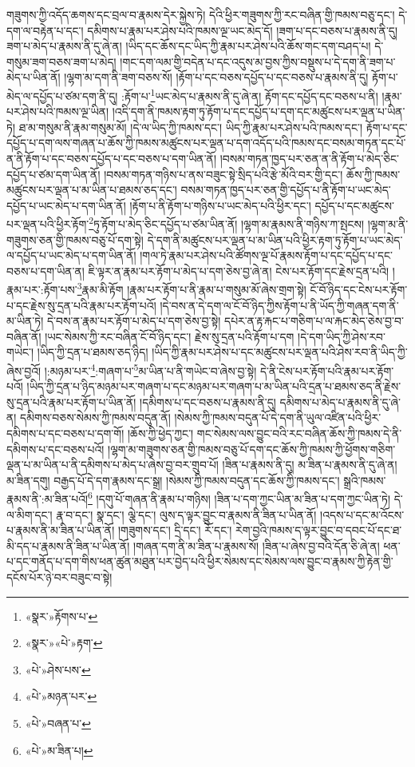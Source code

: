 གཟུགས་ཀྱི་འདོད་ཆགས་དང་བྲལ་བ་རྣམས་དེར་སྐྱེས་ཏེ། དེའི་ཕྱིར་གཟུགས་ཀྱི་རང་བཞིན་གྱི་ཁམས་བཅུ་དང་། དེ་དག་ལ་བརྟེན་པ་དང་། དམིགས་པ་རྣམ་པར་ཤེས་པའི་ཁམས་ལྔ་ཡང་མེད་དོ། །ཟག་པ་དང་བཅས་པ་རྣམས་ནི་དུ། ཟག་པ་མེད་པ་རྣམས་ནི་དུ་ཞེ་ན། །ཡིད་དང་ཆོས་དང་ཡིད་ཀྱི་རྣམ་པར་ཤེས་པའི་ཆོས་གང་དག་བཤད་པ། དེ་གསུམ་ཟག་བཅས་ཟག་པ་མེད། །གང་དག་ལམ་གྱི་བདེན་པ་དང་འདུས་མ་བྱས་ཀྱིས་བསྡུས་པ་དེ་དག་ནི་ཟག་པ་མེད་པ་ཡིན་ནོ། །ལྷག་མ་དག་ནི་ཟག་བཅས་སོ། །རྟོག་པ་དང་བཅས་དཔྱོད་པ་དང་བཅས་པ་རྣམས་ནི་དུ། རྟོག་པ་མེད་ལ་དཔྱོད་པ་ཙམ་དག་ནི་དུ། :རྟོག་པ་\footnote{«སྣར་»རྟོགས་པ་}ཡང་མེད་པ་རྣམས་ནི་དུ་ཞེ་ན། རྟོག་དང་དཔྱོད་དང་བཅས་པ་ནི། །རྣམ་པར་ཤེས་པའི་ཁམས་ལྔ་ཡིན། །འདི་དག་ནི་ཁམས་རྟག་ཏུ་རྟོག་པ་དང་དཔྱོད་པ་དག་དང་མཚུངས་པར་ལྡན་པ་ཡིན་ཏེ། ཐ་མ་གསུམ་ནི་རྣམ་གསུམ་མོ། །དེ་ལ་ཡིད་ཀྱི་ཁམས་དང་། ཡིད་ཀྱི་རྣམ་པར་ཤེས་པའི་ཁམས་དང་། རྟོག་པ་དང་དཔྱོད་པ་དག་ལས་གཞན་པ་ཆོས་ཀྱི་ཁམས་མཚུངས་པར་ལྡན་པ་དག་འདོད་པའི་ཁམས་དང་བསམ་གཏན་དང་པོ་ན་ནི་རྟོག་པ་དང་བཅས་དཔྱོད་པ་དང་བཅས་པ་དག་ཡིན་ནོ། །བསམ་གཏན་ཁྱད་པར་ཅན་ན་ནི་རྟོག་པ་མེད་ཅིང་དཔྱོད་པ་ཙམ་དག་ཡིན་ནོ། །བསམ་གཏན་གཉིས་པ་ནས་བཟུང་སྟེ་སྲིད་པའི་རྩེ་མོའི་བར་གྱི་དང་། ཆོས་ཀྱི་ཁམས་མཚུངས་པར་ལྡན་པ་མ་ཡིན་པ་ཐམས་ཅད་དང་། བསམ་གཏན་ཁྱད་པར་ཅན་གྱི་དཔྱོད་པ་ནི་རྟོག་པ་ཡང་མེད་དཔྱོད་པ་ཡང་མེད་པ་དག་ཡིན་ནོ། །རྟོག་པ་ནི་རྟོག་པ་གཉིས་པ་ཡང་མེད་པའི་ཕྱིར་དང་། དཔྱོད་པ་དང་མཚུངས་པར་ལྡན་པའི་ཕྱིར་རྟོག་\footnote{«སྣར་»«པེ་»རྟག་}ཏུ་རྟོག་པ་མེད་ཅིང་དཔྱོད་པ་ཙམ་ཡིན་ནོ། །ལྷག་མ་རྣམས་ནི་གཉིས་ཀ་སྤངས། །ལྷག་མ་ནི་གཟུགས་ཅན་གྱི་ཁམས་བཅུ་པོ་དག་སྟེ། དེ་དག་ནི་མཚུངས་པར་ལྡན་པ་མ་ཡིན་པའི་ཕྱིར་རྟག་ཏུ་རྟོག་པ་ཡང་མེད་ལ་དཔྱོད་པ་ཡང་མེད་པ་དག་ཡིན་ནོ། །གལ་ཏེ་རྣམ་པར་ཤེས་པའི་ཚོགས་ལྔ་པོ་རྣམས་རྟོག་པ་དང་དཔྱོད་པ་དང་བཅས་པ་དག་ཡིན་ན། ཇི་ལྟར་ན་རྣམ་པར་རྟོག་པ་མེད་པ་དག་ཅེས་བྱ་ཞེ་ན། ངེས་པར་རྟོག་དང་རྗེས་དྲན་པའི། །རྣམ་པར་:རྟོག་པས་\footnote{«པེ་»ཤེས་པས་}རྣམ་མི་རྟོག །རྣམ་པར་རྟོག་པ་ནི་རྣམ་པ་གསུམ་མོ་ཞེས་གྲག་སྟེ། ངོ་བོ་ཉིད་དང་ངེས་པར་རྟོག་པ་དང་རྗེས་སུ་དྲན་པའི་རྣམ་པར་རྟོག་པའོ། །དེ་བས་ན་དེ་དག་ལ་ངོ་བོ་ཉིད་ཀྱིས་རྟོག་པ་ནི་ཡོད་ཀྱི་གཞན་དག་ནི་མ་ཡིན་ཏེ། དེ་བས་ན་རྣམ་པར་རྟོག་པ་མེད་པ་དག་ཅེས་བྱ་སྟེ། དཔེར་ན་རྟ་རྐང་པ་གཅིག་པ་ལ་རྐང་མེད་ཅེས་བྱ་བ་བཞིན་ནོ། །ཡང་སེམས་ཀྱི་རང་བཞིན་ངོ་བོ་ཉིད་དང་། རྗེས་སུ་དྲན་པའི་རྟོག་པ་དག །དེ་དག་ཡིད་ཀྱི་ཤེས་རབ་གཡེང་། །ཡིད་ཀྱི་དྲན་པ་ཐམས་ཅད་ཉིད། །ཡིད་ཀྱི་རྣམ་པར་ཤེས་པ་དང་མཚུངས་པར་ལྡན་པའི་ཤེས་རབ་ནི་ཡིད་ཀྱི་ཞེས་བྱའོ། །:མཉམ་པར་\footnote{«པེ་»མཉན་པར་}:གཞག་པ་\footnote{«པེ་»བཞན་པ་}མ་ཡིན་པ་ནི་གཡེང་བ་ཞེས་བྱ་སྟེ། དེ་ནི་ངེས་པར་རྟོག་པའི་རྣམ་པར་རྟོག་པའོ། །ཡིད་ཀྱི་དྲན་པ་ཉིད་མཉམ་པར་གཞག་པ་དང་མཉམ་པར་གཞག་པ་མ་ཡིན་པའི་དྲན་པ་ཐམས་ཅད་ནི་རྗེས་སུ་དྲན་པའི་རྣམ་པར་རྟོག་པ་ཡིན་ནོ། །དམིགས་པ་དང་བཅས་པ་རྣམས་ནི་དུ། དམིགས་པ་མེད་པ་རྣམས་ནི་དུ་ཞེ་ན། དམིགས་བཅས་སེམས་ཀྱི་ཁམས་བདུན་ནོ། །སེམས་ཀྱི་ཁམས་བདུན་པོ་དེ་དག་ནི་ཡུལ་འཛིན་པའི་ཕྱིར་དམིགས་པ་དང་བཅས་པ་དག་གོ། །ཆོས་ཀྱི་ཕྱེད་ཀྱང་། གང་སེམས་ལས་བྱུང་བའི་རང་བཞིན་ཆོས་ཀྱི་ཁམས་དེ་ནི་དམིགས་པ་དང་བཅས་པའོ། །ལྷག་མ་གཟུགས་ཅན་གྱི་ཁམས་བཅུ་པོ་དག་དང་ཆོས་ཀྱི་ཁམས་ཀྱི་ཕྱོགས་གཅིག་ལྡན་པ་མ་ཡིན་པ་ནི་དམིགས་པ་མེད་པ་ཞེས་བྱ་བར་གྲུབ་པོ། །ཟིན་པ་རྣམས་ནི་དུ། མ་ཟིན་པ་རྣམས་ནི་དུ་ཞེ་ན། མ་ཟིན་དགུ། བརྒྱད་པོ་དེ་དག་རྣམས་དང་སྒྲ། །སེམས་ཀྱི་ཁམས་བདུན་དང་ཆོས་ཀྱི་ཁམས་དང་། སྒྲའི་ཁམས་རྣམས་ནི་:མ་ཟིན་པའོ།\footnote{«པེ་»མ་ཟིན་པ།} །དགུ་པོ་གཞན་ནི་རྣམ་པ་གཉིས། །ཟིན་པ་དག་ཀྱང་ཡིན་མ་ཟིན་པ་དག་ཀྱང་ཡིན་ཏེ། དེ་ལ་མིག་དང་། རྣ་བ་དང་། སྣ་དང་། ལྕེ་དང་། ལུས་ད་ལྟར་བྱུང་བ་རྣམས་ནི་ཟིན་པ་ཡིན་ནོ། །འདས་པ་དང་མ་འོངས་པ་རྣམས་ནི་མ་ཟིན་པ་ཡིན་ནོ། །གཟུགས་དང་། དྲི་དང་། རོ་དང་། རེག་བྱའི་ཁམས་ད་ལྟར་བྱུང་བ་དབང་པོ་དང་ཐ་མི་དད་པ་རྣམས་ནི་ཟིན་པ་ཡིན་ནོ། །གཞན་དག་ནི་མ་ཟིན་པ་རྣམས་སོ། །ཟིན་པ་ཞེས་བྱ་བའི་དོན་ཅི་ཞེ་ན། ཕན་པ་དང་གནོད་པ་དག་གིས་ཕན་ཚུན་མཐུན་པར་བྱེད་པའི་ཕྱིར་སེམས་དང་སེམས་ལས་བྱུང་བ་རྣམས་ཀྱི་རྟེན་གྱི་དངོས་པོར་ཉེ་བར་བཟུང་བ་སྟེ། 